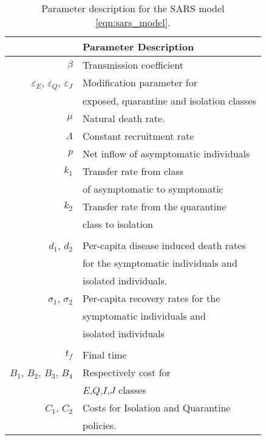 \begin{table}[H]
    \begin{center}
      \begin{tabular}{@{}rl@{}}
        \toprule
        & \multicolumn{1}{l}{\bf{Parameter Description}}
        \\
        \midrule
        $\beta$
          & Transmission coefficient
        \\
        $\varepsilon_E$, 
        $\varepsilon_Q$,
        $\varepsilon_J$
          & Modification parameter for 
          \\
          &  exposed, quarantine and isolation classes 
          \\
        $\mu$
          & Natural death rate.
        \\
        $\Lambda$
          & Constant recruitment rate
        \\
        $p$
          & Net inflow of asymptomatic individuals
        \\
        $k_1$ 
          & Transfer rate from class 
          \\
          & of asymptomatic to symptomatic
          \\
        $k_2$
          & Transfer rate from the quarantine 
          \\ 
          & class to isolation
        \\
        \\
        $d_1$, $d_2$
          & Per-capita disease induced death rates 
          \\
          & for the symptomatic individuals and 
          \\
          & isolated individuals.
        \\
        $\sigma_1$, $\sigma_2$
          & Per-capita recovery rates for the 
          \\
          & symptomatic individuals and 
          \\
          &  isolated individuals
        \\
        \\
        $t_f$
          & Final time 
        \\
        $B_1$, $B_2$, $B_3$, $B_4$
        & Respectively cost for 
        \\
        &
          $E$,$Q$,$I$,$J$ classes
        \\
        $C_1$, $C_2$
        & Costs for Isolation and Quarantine 
        \\
          & policies.
        \\
        \bottomrule
      \end{tabular}
     \caption{Parameter description for the SARS model
     \eqref{eqn:sars_model}.}
     \label{tbl:sars_table_des}
     \end{center}
\end{table}


